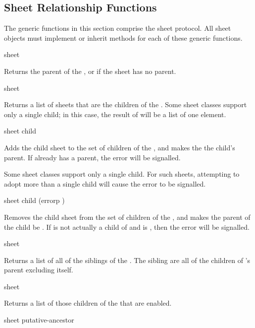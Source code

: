 \subsection {Sheet Relationship Functions}

The generic functions in this section comprise the sheet protocol.  All sheet
objects must implement or inherit methods for each of these generic functions.

 {sheet} 

Returns the parent of the  , or  if the sheet has
no parent.

 {sheet}

Returns a list of sheets that are the children of the  .
Some sheet classes support only a single child; in this case, the result of
 will be a list of one element.
\ReadOnly

 {sheet child}

Adds the child sheet  to the set of children of the 
, and makes the  the child's parent.  If 
already has a parent, the  error will be signalled.

Some sheet classes support only a single child.  For such sheets, attempting to
adopt more than a single child will cause the 
error to be signalled.

 {sheet child \key (errorp )}

Removes the child sheet  from the set of children of the 
, and makes the parent of the child be .  If  is
not actually a child of  and  is , then the
 error will be signalled.

 {sheet}

Returns a list of all of the siblings of the  .  The
sibling are all of the children of 's parent excluding 
itself.
\FreshOutputs

 {sheet}

Returns a list of those children of the   that are enabled.
\FreshOutputs

 {sheet putative-ancestor}

